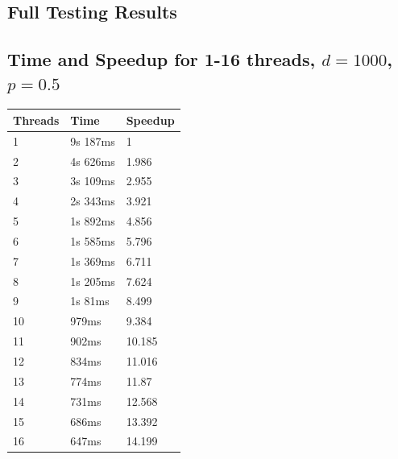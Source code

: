 \documentclass[12pt]{article}
\begin{document}
\clearpage




\begin{appendices}

\clearpage
\section{Full Testing Results}
\subsection{Time and Speedup for 1-16 threads, $d=1000$, $p=0.5$}
\footnotesize{\label{sec:basic}
\begin{center}
\begin{tabular}{|l|l|l|}
\hline
Threads	& Time & Speedup  \\
\hline
1 & 9s 187ms & 1 \\
2 & 4s 626ms & 1.986 \\
3 & 3s 109ms & 2.955 \\
4 & 2s 343ms & 3.921 \\
5 & 1s 892ms & 4.856 \\
6 & 1s 585ms & 5.796 \\
7 & 1s 369ms & 6.711 \\
8 & 1s 205ms & 7.624 \\
9 & 1s 81ms & 8.499 \\
10 & 979ms & 9.384 \\
11 & 902ms & 10.185 \\
12 & 834ms & 11.016 \\
13 & 774ms & 11.87 \\
14 & 731ms & 12.568 \\
15 & 686ms & 13.392 \\
16 & 647ms & 14.199 \\
\hline
\end{tabular}
\end{center}}


\end{appendices}
\end{document}
